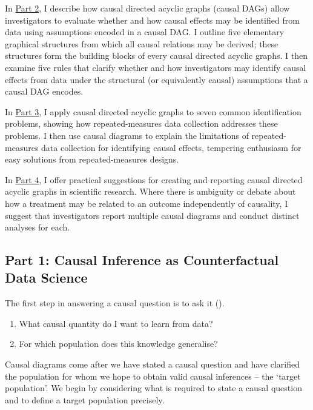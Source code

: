 \documentclass[
  single column]{article}
\providecommand{\tightlist}{%
  \setlength{\itemsep}{0pt}\setlength{\parskip}{0pt}}\usepackage{longtable,booktabs,array}
\begin{document}
In \hyperref[id-sec-2]{Part 2}, I describe how causal directed acyclic
graphs (causal DAGs) allow investigators to evaluate whether and how
causal effects may be identified from data using assumptions encoded in
a causal DAG. I outline five elementary graphical structures from which
all causal relations may be derived; these structures form the building
blocks of every causal directed acyclic graphs. I then examine five
rules that clarify whether and how investigators may identify causal
effects from data under the structural (or equivalently causal)
assumptions that a causal DAG encodes.

In \hyperref[id-sec-3]{Part 3}, I apply causal directed acyclic graphs
to seven common identification problems, showing how repeated-measures
data collection addresses these problems. I then use causal diagrams to
explain the limitations of repeated-measures data collection for
identifying causal effects, tempering enthusiasm for easy solutions from
repeated-measures designs.

In \hyperref[id-sec-4]{Part 4}, I offer practical suggestions for
creating and reporting causal directed acyclic graphs in scientific
research. Where there is ambiguity or debate about how a treatment may
be related to an outcome independently of causality, I suggest that
investigators report multiple causal diagrams and conduct distinct
analyses for each.

\subsection{Part 1: Causal Inference as Counterfactual Data
Science}\label{id-sec-1}

The first step in answering a causal question is to ask it
().

\begin{enumerate}
\def\labelenumi{\arabic{enumi}.}
\tightlist
\item
  What causal quantity do I want to learn from data?
\item
  For which population does this knowledge generalise?
\end{enumerate}

Causal diagrams come after we have stated a causal question and have
clarified the population for whom we hope to obtain valid causal
inferences -- the `target population'. We begin by considering what is
required to state a causal question and to define a target population
precisely.
\end{document}
